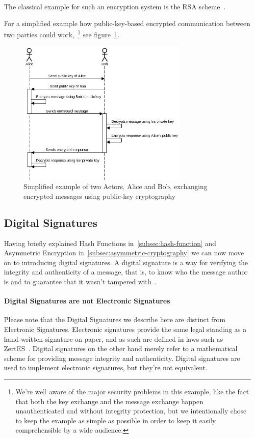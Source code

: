 The classical example for such an encryption system is the \gls{RSA} scheme~\cite{rsa}.

For a simplified example how public-key-based encrypted communication between two parties could work,~\footnote{
We're well aware of the major security problems in this example,
like the fact that both the key exchange and the message exchange happen unauthenticated and without integrity protection,
but we intentionally chose to keep the example as simple as possible in order to keep it easily comprehensible by a wide audience.
}
see figure~\ref{fig:simplepubkeycomm}.

\begin{figure}
    \centering
    \includegraphics[width=0.75\textwidth]{images/simplistic_pubkey_communication.png}
    \caption{Simplified example of two Actors, Alice and Bob, exchanging encrypted messages using public-key cryptography}
    \label{fig:simplepubkeycomm}
\end{figure}


\subsection{Digital Signatures}\label{subsec:digital-signatures}
Having briefly explained Hash Functions in~\ref{subsec:hash-function} and Asymmetric Encryption in~\ref{subsec:asymmetric-cryptography} we can now move on to introducing digital signatures.
A digital signature is a way for verifying the integrity and authenticity of a message, that is,
to know who the message author is and to guarantee that it wasn't tampered with~\cite{digitalsignature}.

\paragraph{Digital Signatures are not Electronic Signatures}
Please note that the Digital Signatures we describe here are distinct from Electronic Signatures.
Electronic signatures provide the same legal standing as a hand-written signature on paper,
and as such are defined in laws such as ZertES~\cite{zertes}.
Digital signatures on the other hand merely refer to a mathematical scheme for providing message integrity and authenticity.
Digital signatures are used to implement electronic signatures, but they're not equivalent.


